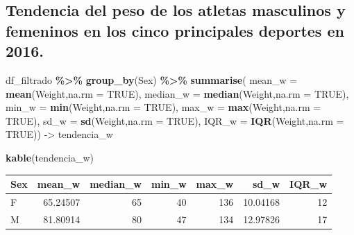 \documentclass[
]{book}
\newenvironment{Shaded}{\begin{snugshade}}{\end{snugshade}}
\newcommand{\AttributeTok}[1]{\textcolor[rgb]{0.13,0.29,0.53}{#1}}
\newcommand{\ConstantTok}[1]{\textcolor[rgb]{0.56,0.35,0.01}{#1}}
\newcommand{\FunctionTok}[1]{\textcolor[rgb]{0.13,0.29,0.53}{\textbf{#1}}}
\newcommand{\NormalTok}[1]{#1}
\newcommand{\OtherTok}[1]{\textcolor[rgb]{0.56,0.35,0.01}{#1}}
\newcommand{\SpecialCharTok}[1]{\textcolor[rgb]{0.81,0.36,0.00}{\textbf{#1}}}
\begin{document}
\subsection*{Tendencia del peso de los atletas masculinos y femeninos en los cinco principales deportes en 2016.}\label{tendencia-del-peso-de-los-atletas-masculinos-y-femeninos-en-los-cinco-principales-deportes-en-2016.}

\begin{Shaded}
\begin{Highlighting}[]
\NormalTok{df\_filtrado }\SpecialCharTok{\%\textgreater{}\%}
 \FunctionTok{group\_by}\NormalTok{(Sex) }\SpecialCharTok{\%\textgreater{}\%} 
  \FunctionTok{summarise}\NormalTok{(}
    \AttributeTok{mean\_w =} \FunctionTok{mean}\NormalTok{(Weight,}\AttributeTok{na.rm =} \ConstantTok{TRUE}\NormalTok{),}
    \AttributeTok{median\_w =} \FunctionTok{median}\NormalTok{(Weight,}\AttributeTok{na.rm =} \ConstantTok{TRUE}\NormalTok{),}
    \AttributeTok{min\_w =} \FunctionTok{min}\NormalTok{(Weight,}\AttributeTok{na.rm =} \ConstantTok{TRUE}\NormalTok{),}
    \AttributeTok{max\_w =} \FunctionTok{max}\NormalTok{(Weight,}\AttributeTok{na.rm =} \ConstantTok{TRUE}\NormalTok{),}
    \AttributeTok{sd\_w =} \FunctionTok{sd}\NormalTok{(Weight,}\AttributeTok{na.rm =} \ConstantTok{TRUE}\NormalTok{),}
    \AttributeTok{IQR\_w =} \FunctionTok{IQR}\NormalTok{(Weight,}\AttributeTok{na.rm =} \ConstantTok{TRUE}\NormalTok{)) }\OtherTok{{-}\textgreater{}}\NormalTok{ tendencia\_w}

\FunctionTok{kable}\NormalTok{(tendencia\_w)}
\end{Highlighting}
\end{Shaded}

\begin{tabular}{l|r|r|r|r|r|r}
\hline
Sex & mean\_w & median\_w & min\_w & max\_w & sd\_w & IQR\_w\\
\hline
F & 65.24507 & 65 & 40 & 136 & 10.04168 & 12\\
\hline
M & 81.80914 & 80 & 47 & 134 & 12.97826 & 17\\
\hline
\end{tabular}
\end{document}
